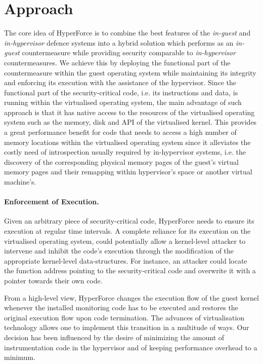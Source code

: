 \section{Approach}\label{hf:approach}
The core idea of HyperForce is to combine the best features of the \textit{in-guest} and \textit{in-hypervisor} defence systems into a hybrid solution which performs as an \textit{in-guest} countermeasure while providing security comparable to \textit{in-hypervisor} countermeasures. 
We achieve this by deploying the functional part of the countermeasure within the guest operating system while maintaining its integrity and enforcing its execution with the assistance of the hypervisor. Since the functional part of the security-critical code, i.e. its instructions and data, is running within the virtualised operating system, the main advantage of such approach is that it has native access to the resources of the virtualised operating system such as the memory, disk and API of the virtualised kernel. 
This provides a great performance benefit for code that needs to access a high number of memory locations within the virtualised operating system since it alleviates the costly need of introspection usually required by in-hypervisor systems, i.e. the discovery of the corresponding physical memory pages of the guest's virtual memory pages and their remapping within hypervisor's space or another virtual machine's. 

\paragraph{Enforcement of Execution.}
Given an arbitrary piece of security-critical code, HyperForce needs to ensure its execution at regular time intervals. A complete reliance for its execution on the virtualised operating system, could potentially allow a kernel-level attacker to intervene and inhibit the code's execution through the modification of the appropriate kernel-level data-structures. For instance, an attacker could locate the function address pointing to the security-critical code and overwrite it with a pointer towards their own code.

From a high-level view, HyperForce changes the execution flow of the guest kernel whenever the installed monitoring code has to be executed and restores the original execution flow upon code termination. 
The advances of virtualisation technology allows one to implement this transition in a multitude of ways. Our decision has been influenced by the desire of minimizing the amount of instrumentation code in the hypervisor and of keeping performance overhead to a minimum.

